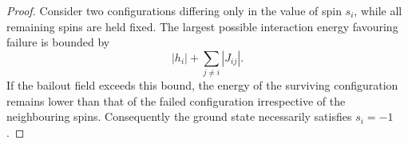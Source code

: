 \documentclass[10pt,a4paper]{amsart}
\begin{document}
\begin{proof}
Consider two configurations differing only in the value of spin $s_i$, while all remaining spins are held fixed. The largest possible interaction energy favouring failure is bounded by
\[
|h_i|+\sum_{j\neq i}|J_{ij}|.
\]
If the bailout field exceeds this bound, the energy of the surviving configuration remains lower than that of the failed configuration irrespective of the neighbouring spins. Consequently the ground state necessarily satisfies $s_i=-1$.
\end{proof}
\end{document}
